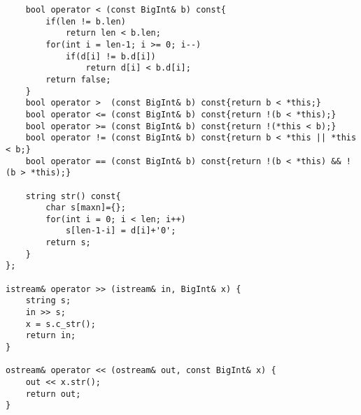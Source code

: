 \begin{verbatim}
    bool operator < (const BigInt& b) const{
        if(len != b.len)
            return len < b.len;
        for(int i = len-1; i >= 0; i--)
            if(d[i] != b.d[i])
                return d[i] < b.d[i];
        return false;
    }
    bool operator >  (const BigInt& b) const{return b < *this;}
    bool operator <= (const BigInt& b) const{return !(b < *this);}
    bool operator >= (const BigInt& b) const{return !(*this < b);}
    bool operator != (const BigInt& b) const{return b < *this || *this < b;}
    bool operator == (const BigInt& b) const{return !(b < *this) && !(b > *this);}
 
    string str() const{
        char s[maxn]={};
        for(int i = 0; i < len; i++)
            s[len-1-i] = d[i]+'0';
        return s;
    }
};
 
istream& operator >> (istream& in, BigInt& x) {
    string s;
    in >> s;
    x = s.c_str();
    return in;
}
 
ostream& operator << (ostream& out, const BigInt& x) {
    out << x.str();
    return out;
}
\end{verbatim}